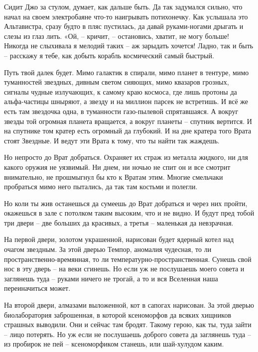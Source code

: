 \documentclass[ebook,oneside,final,openright]{memoir}
\begin{document}
\par
Сидит Джо за стулом, думает, как дальше быть. Да так задумался сильно, что начал на своем электробаяне что-то наигрывать потихонечку. Как услышала это Альтавистра, сразу будто в пляс пустилась, да давай руками-ногами дрыгать и слезы из глаз лить. «Ой, – кричит, – остановись, хватит, не могу больше! Никогда не слыхивала я мелодий таких – аж зарыдать хочется! Ладно, так и быть – расскажу я тебе, как добыть корабль космический самый быстрый.\par
\par
Путь твой далек будет. Мимо галактик в спирали, мимо планет в тентуре, мимо туманностей звездных, дивным светом сияющих, мимо квазаров грозных, сигналы чудные излучающих, к самому краю космоса, где лишь протоны да альфа-частицы шныряют, а звезду и на миллион парсек не встретишь. И всё же есть там звездочка одна, в туманности газо-пылевой спрятавшаяся. А вокруг звезды той огромная планета вращается, а вокруг планеты – спутник вертится. И на спутнике том кратер есть огромный да глубокий. И на дне кратера того Врата стоят Звездные. И ведут эти Врата к тому, что ты найти так жаждешь.\par
\par
Но непросто до Врат добраться. Охраняет их страж из металла жидкого, ни для какого оружия не уязвимый. Ни днем, ни ночью не спит он и все смотрит внимательно, не прошмыгнул бы кто к Вратам этим. Многие смельчаки пробраться мимо него пытались, да так там костьми и полегли.\par
\par
Но коли ты жив останешься да сумеешь до Врат добраться и через них пройти, окажешься в зале с потолком таким высоким, что и не видно. И будут пред тобой три двери – две больших да красивых, а третья – маленькая да невзрачная.\par
\par
На первой двери, золотом украшенной, нарисован будет ядерный котел над очагом звездным. За этой дверью Темпор, аномалия чудесная, то ли пространственно-времянная, то ли температурно-пространственная. Сунешь свой нос в эту дверь – на веки сгинешь. Но если уж не послушаешь моего совета и заглянешь туда – руками ничего не трогай, а то и вся Вселенная наша переиначиться может.\par
\par
На второй двери, алмазами выложенной, кот в сапогах нарисован. За этой дверью биолаборатория заброшенная, в которой ксеноморфов да всяких хищников страшных выводили. Они и сейчас там бродят. Такому герою, как ты, туда зайти – лицо потерять. Но уж если не послушаешь доброго совета да заглянешь туда – из пробирок не пей – ксеноморфиком станешь, или шай-хулудом каким.\par
\end{document}
